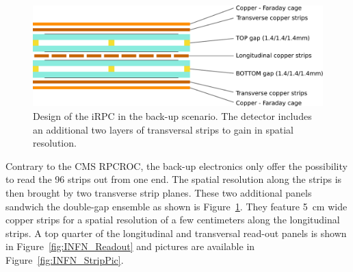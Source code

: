 	\begin{figure}[H]
		\centering
		\includegraphics[width = 0.8\linewidth]{fig/chapt6/iRPC-INFN-Design.pdf}
		\caption{\label{fig:INFN-Design} Design of the iRPC in the back-up scenario. The detector includes an additional two layers of transversal strips to gain in spatial resolution.}
    \end{figure}
	
	Contrary to the CMS RPCROC, the back-up electronics only offer the possibility to read the 96 strips out from one end. The spatial resolution along the strips is then brought by two transverse strip planes. These two additional panels sandwich the double-gap ensemble as shown is Figure~\ref{fig:INFN-Design}. They feature \SI{5}{cm} wide copper strips for a spatial resolution of a few centimeters along the longitudinal strips. A top quarter of the longitudinal and transversal read-out panels is shown in Figure~\ref{fig:INFN_Readout} and pictures are available in Figure~\ref{fig:INFN_StripPic}.
	 
